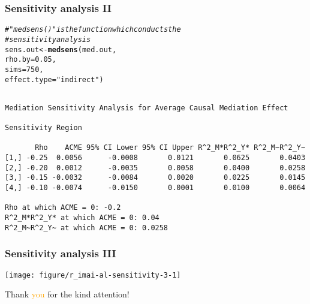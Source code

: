 \documentclass[11pt,english,dvipsnames,aspectratio=169,handout]{beamer}\usepackage[]{graphicx}\usepackage[]{xcolor}
\makeatletter
\def\maxwidth{ %
  \ifdim\Gin@nat@width>\linewidth
    \linewidth
  \else
    \Gin@nat@width
  \fi
}
\newcommand{\hlnum}[1]{\textcolor[rgb]{0.686,0.059,0.569}{#1}}%
\newcommand{\hlstr}[1]{\textcolor[rgb]{0.192,0.494,0.8}{#1}}%
\newcommand{\hlcom}[1]{\textcolor[rgb]{0.678,0.584,0.686}{\textit{#1}}}%
\newcommand{\hlstd}[1]{\textcolor[rgb]{0.345,0.345,0.345}{#1}}%
\newcommand{\hlkwb}[1]{\textcolor[rgb]{0.69,0.353,0.396}{#1}}%
\newcommand{\hlkwc}[1]{\textcolor[rgb]{0.333,0.667,0.333}{#1}}%
\newcommand{\hlkwd}[1]{\textcolor[rgb]{0.737,0.353,0.396}{\textbf{#1}}}%
\newenvironment{kframe}{%
 \def\at@end@of@kframe{}%
 \ifinner\ifhmode%
  \def\at@end@of@kframe{\end{minipage}}%
  \begin{minipage}{\columnwidth}%
 \fi\fi%
 \def\FrameCommand##1{\hskip\@totalleftmargin \hskip-\fboxsep
 \colorbox{shadecolor}{##1}\hskip-\fboxsep
     \hskip-\linewidth \hskip-\@totalleftmargin \hskip\columnwidth}%
 \MakeFramed {\advance\hsize-\width
   \@totalleftmargin\z@ \linewidth\hsize
   \@setminipage}}%
 {\par\unskip\endMakeFramed%
 \at@end@of@kframe}
\newenvironment{knitrout}{}{} %
\makeatother
\begin{document}
\begin{frame}[fragile]
  \frametitle{Sensitivity analysis II}
  
\begin{knitrout}\scriptsize
{}\color{fgcolor}\begin{kframe}
\begin{alltt}
\hlcom{# "medsens()" is the function which conducts the}
\hlcom{# sensitivity analysis}
\hlstd{sens.out} \hlkwb{<-} \hlkwd{medsens}\hlstd{(med.out,}
                    \hlkwc{rho.by} \hlstd{=} \hlnum{0.05}\hlstd{,}
                    \hlkwc{sims} \hlstd{=} \hlnum{750}\hlstd{,}
                    \hlkwc{effect.type} \hlstd{=} \hlstr{"indirect"}\hlstd{)}
\end{alltt}
\end{kframe}
\end{knitrout}

\begin{knitrout}\tiny
{}\color{fgcolor}\begin{kframe}
\begin{verbatim}

Mediation Sensitivity Analysis for Average Causal Mediation Effect

Sensitivity Region

       Rho    ACME 95% CI Lower 95% CI Upper R^2_M*R^2_Y* R^2_M~R^2_Y~
[1,] -0.25  0.0056      -0.0008       0.0121       0.0625       0.0403
[2,] -0.20  0.0012      -0.0035       0.0058       0.0400       0.0258
[3,] -0.15 -0.0032      -0.0084       0.0020       0.0225       0.0145
[4,] -0.10 -0.0074      -0.0150       0.0001       0.0100       0.0064

Rho at which ACME = 0: -0.2
R^2_M*R^2_Y* at which ACME = 0: 0.04
R^2_M~R^2_Y~ at which ACME = 0: 0.0258 
\end{verbatim}
\end{kframe}
\end{knitrout}

\end{frame}

\begin{frame}[fragile]
  \frametitle{Sensitivity analysis III}
  
\begin{knitrout}
\color{fgcolor}

{\centering \texttt{[image: figure/r\_imai-al-sensitivity-3-1]} 

}


\end{knitrout}
  
\end{frame}


\begin{frame}
\begin{center}
    \Huge Thank \textcolor{orange}{you} for the kind attention!
\end{center}
\end{frame}


\begin{frame}

\scriptsize
\end{frame}
\end{document}
